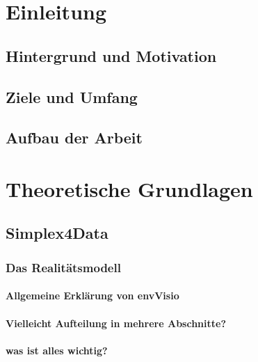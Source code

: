 \documentclass[oneside,a4paper,11pt,openright]{scrreprt}
\begin{document}

\cleardoublepage

\tableofcontents

\listoffigures

\listoftables

\lstlistoflistings

\printacronyms



\chapter{Einleitung}

\section{Hintergrund und Motivation}
\section{Ziele und Umfang}
\section{Aufbau der Arbeit}

\chapter{Theoretische Grundlagen}

\section{Simplex4Data}
\parencite{rudolfUmweltdatenmanagementGeoInspiration2018}
\subsection{Das Realitätsmodell}
\subsubsection{Allgemeine Erklärung von envVisio}
\subsubsection{Vielleicht Aufteilung in mehrere Abschnitte?}
\subsubsection{was ist alles wichtig?}
\end{document}
